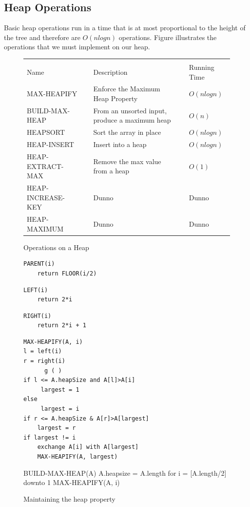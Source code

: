 \documentclass[10pt,a4paper]{article}
\begin{document}
\subsection{Heap Operations}
Basic heap operations run in a time that is at most proportional to the height of the tree and therefore are $O(n log n)$ operations. Figure \cite{heapops} illustrates the operations that we must implement on our heap. 
\begin{figure}
\caption{Operations on a Heap}
\begin{center}
\begin{tabular}{| l | l | l | }
  \hline \\
  Name && Description && Running Time 
  \hline \\
  MAX-HEAPIFY && Enforce the Maximum Heap Property && $O(n log n)$ \\
  BUILD-MAX-HEAP && From an unsorted input, produce a maximum heap && $O(n)$ \\
  HEAPSORT && Sort the array in place && $O(n log n)$ \\
  HEAP-INSERT && Insert into a heap && $O(n log n)$ \\
  HEAP-EXTRACT-MAX && Remove the max value from a heap && $O(1)$ \\
  HEAP-INCREASE-KEY && Dunno && Dunno \\
  HEAP-MAXIMUM && Dunno && Dunno 
\end{tabular}
\label{heapops}
\end{center}
\end{figure}
\begin{figure}
\caption{Maintaining the heap property}
\begin{center}

\begin{lstlisting}
PARENT(i)
	return FLOOR(i/2)
\end{lstlisting}
	
\begin{lstlisting}
LEFT(i)
	return 2*i
\end{lstlisting}

\begin{lstlisting}
RIGHT(i)
	return 2*i + 1
\end{lstlisting}

\begin{lstlisting}
MAX-HEAPIFY(A, i)
l = left(i)
r = right(i)
      g ( )
if l <= A.heapSize and A[l]>A[i] 
     largest = 1
else 
	 largest = i
if r <= A.heapSize & A[r]>A[largest]
	largest = r
if largest != i
	exchange A[i] with A[largest]	
	MAX-HEAPIFY(A, largest)
\end{lstlisting}


\begin{lslisting}
BUILD-MAX-HEAP(A)
A.heapsize = A.length 
for i = [A.length/2] downto 1
	MAX-HEAPIFY(A, i) 
\end{lslisting}

\label{heapify}
\end{center}
\end{figure}
\end{document}
